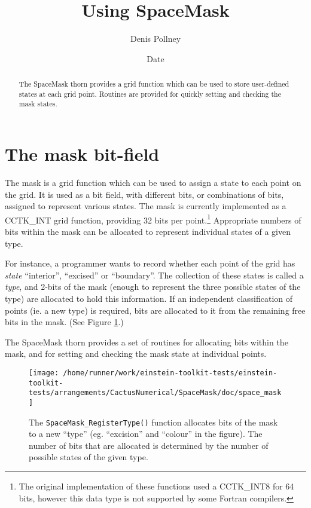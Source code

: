 \documentclass{article}
\begin{document}
\title{Using SpaceMask}
\author{Denis Pollney}
\date{$ $Date$ $}

\maketitle


\begin{abstract}
The SpaceMask thorn provides a grid function which can be used to
store user-defined states at each grid point. Routines are provided
for quickly setting and checking the mask states.
\end{abstract}

\section{The mask bit-field}

The mask is a grid function which can be used to assign a state to
each point on the grid. It is used as a bit field, with different
bits, or combinations of bits, assigned to represent various states.
The mask is currently implemented as a CCTK\_INT grid function,
providing 32 bits per point.\footnote{The original implementation of
these functions used a CCTK\_INT8 for 64 bits, however this data type
is not supported by some Fortran compilers.} Appropriate numbers of
bits within the mask can be allocated to represent individual states
of a given type.

For instance, a programmer wants to record whether each point of the
grid has \emph{state} ``interior'', ``excised'' or ``boundary''. The
collection of these states is called a \emph{type}, and 2-bits of the
mask (enough to represent the three possible states of the type) are
allocated to hold this information. If an independent classification
of points (ie. a new type) is required, bits are allocated to it from
the remaining free bits in the mask. (See Figure \ref{fig:mask_bits}.)

The SpaceMask thorn provides a set of routines for allocating bits
within the mask, and for setting and checking the mask state at
individual points.

\begin{figure}
  \centering
  \texttt{[image: /home/runner/work/einstein-toolkit-tests/einstein-toolkit-tests/arrangements/CactusNumerical/SpaceMask/doc/space\_mask]}
  \caption{The \texttt{SpaceMask\_RegisterType()} function allocates
  bits of the mask to a new ``type'' (eg. ``excision'' and ``colour''
  in the figure). The number of bits that are allocated is determined
  by the number of possible states of the given type.}
  \label{fig:mask_bits}
\end{figure}
\end{document}
